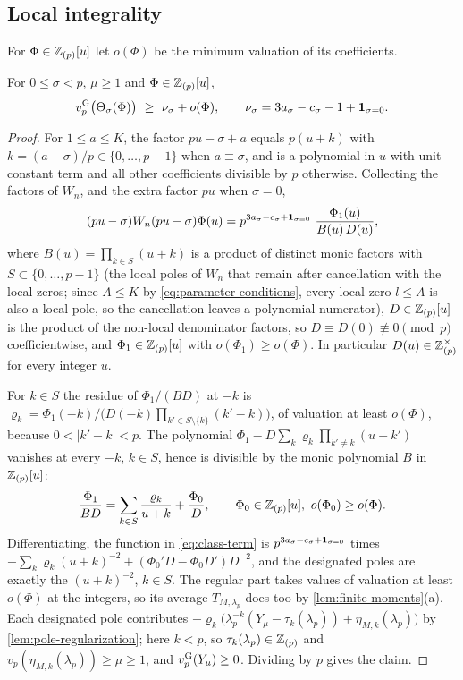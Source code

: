 \subsection{Local integrality}\label{sec:local-integrality}
For $\Phi\in\mathbb{Z}_{(p)}[u]$ let $o(\Phi)$ be the minimum valuation of its coefficients.

\begin{lemma}\label{lem:local-integrality}
For $0\le\sigma<p$, $\mu\ge1$ and $\Phi\in\mathbb{Z}_{(p)}[u]$,
\[
\vg p\bigl(\Theta_\sigma(\Phi)\bigr)\ \ge\ \nu_\sigma+o(\Phi),\qquad \nu_\sigma=3a_\sigma-c_\sigma-1+\ind_{\sigma=0}.
\]
\end{lemma}

\begin{proof}
For $1\le a\le K$, the factor $pu-\sigma+a$ equals $p(u+k)$ with $k=(a-\sigma)/p\in\{0,\dots,p-1\}$ when $a\equiv\sigma$, and is a polynomial in $u$ with unit constant term and all other coefficients divisible by $p$ otherwise. Collecting the factors of $W_n$, and the extra factor $pu$ when $\sigma=0$,
\[
(pu-\sigma)W_n(pu-\sigma)\Phi(u)=p^{3a_\sigma-c_\sigma+\ind_{\sigma=0}}\ \frac{\Phi_1(u)}{B(u)\,D(u)},
\]
where $B(u)=\prod_{k\in S}(u+k)$ is a product of distinct monic factors with $S\subset\{0,\dots,p-1\}$ (the local poles of $W_n$ that remain after cancellation with the local zeros; since $A\le K$ by \eqref{eq:parameter-conditions}, every local zero $l\le A$ is also a local pole, so the cancellation leaves a polynomial numerator), $D\in\mathbb{Z}_{(p)}[u]$ is the product of the non-local denominator factors, so $D\equiv D(0)\not\equiv0\pmod p$ coefficientwise, and $\Phi_1\in\mathbb{Z}_{(p)}[u]$ with $o(\Phi_1)\ge o(\Phi)$. In particular $D(u)\in\mathbb{Z}_{(p)}^\times$ for every integer $u$.

For $k\in S$ the residue of $\Phi_1/(BD)$ at $-k$ is $\varrho_k=\Phi_1(-k)/\bigl(D(-k)\prod_{k'\in S\setminus\{k\}}(k'-k)\bigr)$, of valuation at least $o(\Phi)$, because $0<|k'-k|<p$. The polynomial $\Phi_1-D\sum_k\varrho_k\prod_{k'\ne k}(u+k')$ vanishes at every $-k$, $k\in S$, hence is divisible by the monic polynomial $B$ in $\mathbb{Z}_{(p)}[u]$:
\[
\frac{\Phi_1}{BD}=\sum_{k\in S}\frac{\varrho_k}{u+k}+\frac{\Phi_0}{D},\qquad \Phi_0\in\Zp[u],\ o(\Phi_0)\ge o(\Phi).
\]
Differentiating, the function in \eqref{eq:class-term} is $p^{3a_\sigma-c_\sigma+\mathbf{1}_{\sigma=0}}$ times $-\sum_k\varrho_k(u+k)^{-2}+(\Phi_0'D-\Phi_0D')D^{-2}$, and the designated poles are exactly the $(u+k)^{-2}$, $k\in S$. The regular part takes values of valuation at least $o(\Phi)$ at the integers, so its average $T_{M,\lambda_p}$ does too by \cref{lem:finite-moments}(a). Each designated pole contributes $-\varrho_k\bigl(\lambda_p^{-k}(Y_\mu-\tau_k(\lambda_p))+\eta_{M,k}(\lambda_p)\bigr)$ by \cref{lem:pole-regularization}; here $k<p$, so $\tau_k(\lambda_p)\in\mathbb{Z}_{(p)}$ and $v_p(\eta_{M,k}(\lambda_p))\ge \mu\ge1$, and $v^{\mathrm{G}}_{p}(Y_\mu)\ge0$. Dividing by $p$ gives the claim.
\end{proof}

